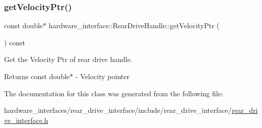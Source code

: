 \subsubsection{\texorpdfstring{get\+Velocity\+Ptr()}{getVelocityPtr()}}
{\footnotesize\ttfamily const double$\ast$ hardware\+\_\+interface\+::\+Rear\+Drive\+Handle\+::get\+Velocity\+Ptr (\begin{DoxyParamCaption}{ }\end{DoxyParamCaption}) const\hspace{0.3cm}{\ttfamily [inline]}}



Get the Velocity Ptr of rear drive handle. 

\begin{DoxyReturn}{Returns}
const double$\ast$ -\/ Velocity pointer 
\end{DoxyReturn}


The documentation for this class was generated from the following file\+:\begin{DoxyCompactItemize}
\item 
hardware\+\_\+interfaces/rear\+\_\+drive\+\_\+interface/include/rear\+\_\+drive\+\_\+interface/\hyperlink{rear__drive__interface_8h}{rear\+\_\+drive\+\_\+interface.\+h}\end{DoxyCompactItemize}
